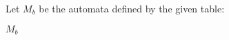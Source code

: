 Let $M_b$ be the automata defined by the given table:
\begin{automata}{$M_b$}
	
	
	
	
	
	
	
	
\end{automata}